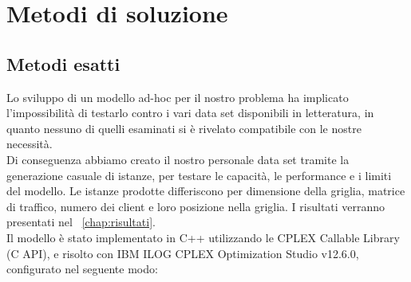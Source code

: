 \chapter{Metodi di soluzione} \label{cap:metodi}

\ifpdf
    \graphicspath{{Chapter6/Figs/Raster/}{Chapter6/Figs/PDF/}{Chapter6/Figs/}}
\else
    \graphicspath{{Chapter6/Figs/Vector/}{Chapter6/Figs/}}
\fi

\section{Metodi esatti}
Lo sviluppo di un modello ad-hoc per il nostro problema ha implicato l'impossibilità di testarlo contro i vari data set disponibili in letteratura, in quanto nessuno di quelli esaminati si è rivelato compatibile con le nostre necessità. \\
Di conseguenza abbiamo creato il nostro personale data set tramite la generazione casuale di istanze, per testare le capacità, le performance e i limiti del modello. Le istanze prodotte differiscono per dimensione della griglia, matrice di traffico, numero dei client e loro posizione nella griglia. I risultati verranno presentati nel \chaptername\ \ref{chap:risultati}. \\
Il modello è stato implementato in C++ utilizzando le CPLEX Callable Library (C API), e risolto con IBM ILOG CPLEX Optimization Studio v12.6.0, configurato nel seguente modo:

